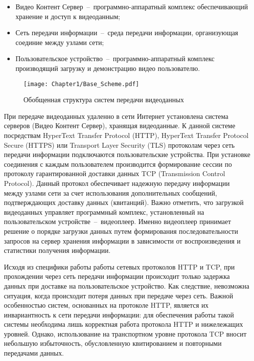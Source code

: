\begin{itemize}
  \item Видео Контент Сервер~--~программно-аппаратный комплекс обеспечивающий хранение и доступ к видеоданным;
  \item Сеть передачи информации~--~среда передачи информации, организующая соединие между узлами сети;
  \item Пользовательское устройство~--~программно-аппаратный комплекс производящий загрузку и демонстрацию видео пользователю.
\end{itemize}

\begin{figure}[htbp]
\begin{center}
\texttt{[image: Chapter1/Base\_Scheme.pdf]}
\caption{Обобщенная структура систем передачи видеоданных}
\label{fig:Base_Scheme}
\end{center}
\end{figure}

При передаче видеоданных удаленно в сети Интернет установлена система серверов (Видео Контент Сервер), хранящая видеоданные. К данной системе посредствам HyperText Transfer Protocol (HTTP), HyperText Transfer Protocol Secure (HTTPS) или Transport Layer Security (TLS) протоколам через сеть передачи информации подключаются пользовательские устройства. При установке соединения с каждым пользователем производится формирование сессии по протоколу гарантированной доставки данных TCP (Transmission Control Protocol). Данный протокол обеспечивает надежную передачу информации между узлами сети за счет использования дополнительных сообщений, подтверждающих доставку данных (квитанций). Важно отметить, что загрузкой видеоданных управляет программный комплекс, установленный на пользовательском устройстве~--~видеоплеер. Именно видеоплеер принимает решение о порядке загрузки данных путем формирования последовательности запросов на сервер хранения информации в зависимости от воспроизведения и статистики получения информации.

Исходя из специфики работы работы сетевых протоколов HTTP и TCP, при прохождении через сеть передачи информации происходит только задержка данных при доставке на пользовательское устройство. Как следствие, невозможна ситуация, когда происходит потеря данных при передаче через сеть. Важной особенностью систем, основанных на протоколе HTTP, является их инвариантность к сети передачи информации: для обеспечения работы такой системы необходима лишь корректная работа протокола HTTP и нижележащих уровней. Однако, использование на транспортном уровне протокола TCP вносит небольшую избыточность, обусловленную квитированием и повторными передачами данных.

